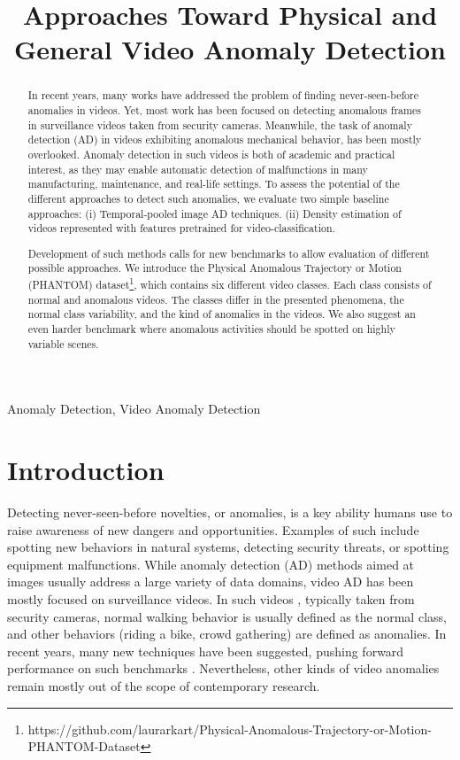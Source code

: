 \documentclass{article}
\title{Approaches Toward Physical and General Video Anomaly Detection}
\begin{document}
\ninept
\maketitle
\begin{abstract}
In recent years, many works have addressed the problem of finding never-seen-before anomalies in videos. Yet, most work has been focused on detecting anomalous frames in surveillance videos taken from security cameras. Meanwhile, the task of anomaly detection (AD) in videos exhibiting anomalous mechanical behavior, has been mostly overlooked. Anomaly detection in such videos is both of academic and practical interest, as they may enable automatic detection of malfunctions in many manufacturing, maintenance, and real-life settings. To assess the potential of the different approaches to detect such anomalies, we evaluate two simple baseline approaches: (i) Temporal-pooled image AD techniques. (ii) Density estimation of videos represented with features pretrained for video-classification.

Development of such methods calls for new benchmarks to allow evaluation of different possible approaches. We introduce the Physical Anomalous Trajectory or Motion (PHANTOM) dataset\footnote{https://github.com/laurarkart/Physical-Anomalous-Trajectory-or-Motion-PHANTOM-Dataset}, which contains six different video classes. Each class consists of normal and anomalous videos. The classes differ in the presented phenomena, the normal class variability, and the kind of anomalies in the videos. We also suggest an even harder benchmark where anomalous activities should be spotted on highly variable scenes. 
\end{abstract}

\begin{keywords}
Anomaly Detection, Video Anomaly Detection
\end{keywords}

\section{Introduction}

Detecting never-seen-before novelties, or anomalies, is a key ability humans use to raise awareness of new dangers and opportunities. Examples of such include spotting new behaviors in natural systems, detecting security threats, or spotting equipment malfunctions. While anomaly detection (AD) methods aimed at images \cite{reiss2021panda,hendrycks2019using,tack2020csi} usually address a large variety of data domains, video AD has been mostly focused on surveillance videos. In such videos \cite{luo2017revisit,mahadevan2010anomaly}, typically taken from security cameras, normal walking behavior is usually defined as the normal class, and other behaviors (riding a bike, crowd gathering) are defined as anomalies. In recent years, many new techniques have been suggested, pushing forward performance on such benchmarks \cite{georgescu2021anomaly,park2020learning}. Nevertheless, other kinds of video anomalies remain mostly out of the scope of contemporary research. 
\end{document}
